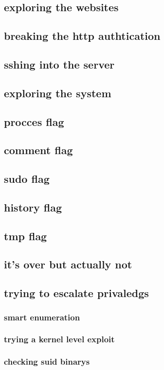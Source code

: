 \documentclass[a4paper]{article}
\begin{document}
\subsection{exploring the websites}
\subsection{breaking the http authtication}
\subsection{sshing into the server}
\subsection{exploring the system}
\subsection{procces flag}
\subsection{comment flag}
\subsection{sudo flag}
\subsection{history flag}
\subsection{tmp flag}
\subsection{it's over but actually not}
\subsection{trying to escalate privaledgs}
\subsubsection{smart enumeration}
\subsubsection{trying a kernel level exploit}
\subsubsection{checking suid binarys}
\end{document}

